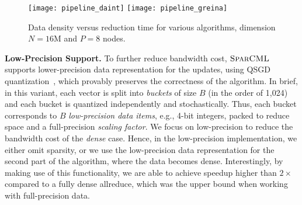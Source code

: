 \documentclass[11pt]{article}
\renewcommand{\paragraph}[1]{\vspace{0.1em} \noindent \textbf{#1}}
\newcommand{\mml}{$\textsc{SparCML}$}
\begin{document}
\begin{figure*}[htbp]
	\centering
	\texttt{[image: pipeline\_daint]}
	\texttt{[image: pipeline\_greina]}
	\caption{Data density versus reduction time for various algorithms, dimension $N=16\textrm{M}$ and $P=8$ nodes.}
	\label{fig:ComparePipeline}
\end{figure*}

\paragraph{Low-Precision Support.}
To further reduce bandwidth cost, \mml{} supports lower-precision data
representation for the updates, using QSGD
quantization~\cite{alistarh2016qsgd}, which provably preserves the
correctness of the algorithm. In brief, in this variant, each vector is
split into \emph{buckets} of size $B$ (in the order of 1,024) and each
bucket is quantized independently and  stochastically. Thus, each bucket
corresponds to $B$ \emph{low-precision data items}, e.g., 4-bit integers,
packed to reduce space and a full-precision \emph{scaling factor}.  We
focus on low-precision to reduce the bandwidth cost of the \emph{dense}
case. Hence, in the low-precision implementation, we either omit
sparsity, or we use the low-precision data representation for the second
part of the \dsar{} algorithm, where the data becomes dense.
Interestingly, by making use of this functionality, we are able
to achieve speedup higher than  $2\times$ compared to a fully dense
allreduce, which was the upper bound when working with full-precision
data. 
%
%
\end{document}
